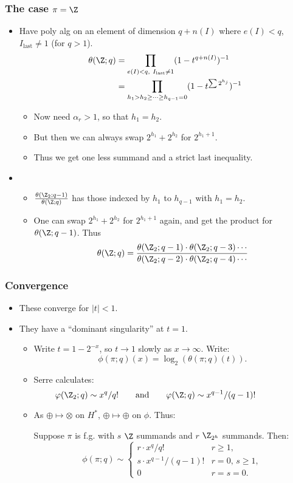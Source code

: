 \documentclass[11pt]{article}
\begin{document}
\begin{SerreCohModTwoEilMacLane}
\subsubsection*{The case $\pi=\Z$}
\begin{itemize}\squishlist
\item Have poly alg on an element of dimension $q+n(I)$ where $e(I)<q$, $I_\text{last}\neq1$ (for $q>1$).
\begin{align*}
\theta(\Z;q)&=\mathop{\prod_{e(I)<q,\ I_\text{last}\neq1}}(1-t^{q+n(I)})^{-1}\\
&=\prod_{h_1> h_2\geq\cdots\geq h_{q-1}=0}(1-t^{\sum2^{h_j}})^{-1}
\end{align*}
\begin{itemize}\squishlist
\item Now need $\alpha_r>1$, so that $h_1=h_2$.
\item But then we can always swap $2^{h_1}+2^{h_2}$ for $2^{h_1+1}$.
\item Thus we get one less summand and a strict last inequality.
\end{itemize}
\item
\begin{itemize}\squishlist
\item $\frac{\theta(\Z_2;q-1)}{\theta(\Z;q)}$ has those indexed by $h_1$ to $h_{q-1}$ with $h_1=h_2$.
\item One can swap $2^{h_1}+2^{h_2}$ for $2^{h_1+1}$ again, and get the product for $\theta(\Z;q-1)$. Thus
\[\theta(\Z;q)=\frac{\theta(\Z_2;q-1) \cdot\theta(\Z_2;q-3)\cdots}{\theta(\Z_2;q-2)\cdot \theta(\Z_2;q-4)\cdots}\]
\end{itemize}
\end{itemize}
\pagebreak
\subsubsection*{Convergence}
\begin{itemize}\squishlist
\item These converge for $|t|<1$.
\item They have a ``dominant singularity'' at $t=1$.
\begin{itemize}\squishlist
\item Write $t=1-2^{-x}$, so $t\to1$ slowly as $x\to\infty$. Write:
\[\phi(\pi;q)(x)=\log_2(\theta(\pi;q)(t)).\]
\item Serre calculates:
\[\phi(\Z_2;q)\sim x^q/q!\text{\qquad and\qquad}\phi(\Z;q)\sim x^{q-1}/(q-1)!\qquad\qquad\]
\item As $\oplus\mapsto\otimes$ on $H^*$, $\oplus\mapsto\oplus$ on $\phi$. Thus:
\begin{thm*}
Suppose $\pi$ is f.g. with $s$ $\Z$ summands and $r$ $\Z_{2^h}$ summands. Then:
\[\phi(\pi;q)\sim \begin{cases}
r\cdot x^q/q! & r\geq1,\\
s\cdot x^{q-1}/(q-1)! & r=0,\,s\geq1,\\
0& r=s=0.
\end{cases}\]
\end{thm*}
\end{itemize}
\end{itemize}

\end{SerreCohModTwoEilMacLane}
\end{document}

